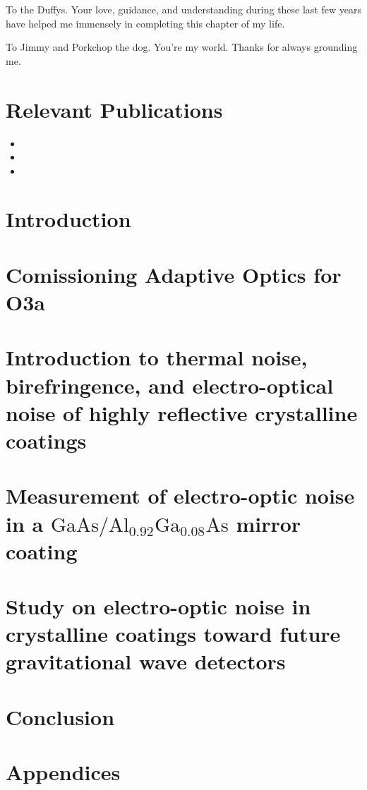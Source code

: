 \documentclass[12pt]{report}
\newif\ifswitch
\newcommand{\algaas}{\mathrm{Al_{0.92}Ga_{0.08}As}}
\newcommand{\gaas}{\mathrm{GaAs}}
\begin{document}
To the Duffys. Your love, guidance, and understanding during these last few years have helped me immensely in completing this chapter of my life.

To Jimmy and Porkchop the dog. You’re my world. Thanks for always grounding me.

\ifswitch
    \nobibliography*
    \chapter*{Relevant Publications}
    \begin{itemize}
        \item {}
        \item {}
        \item {}
    \end{itemize}


\tableofcontents


\chapter{Introduction}

\newpage

\chapter{Comissioning Adaptive Optics for O3a}

\newpage

\chapter{Introduction to thermal noise, birefringence, and electro-optical noise of highly reflective crystalline coatings}

\newpage 

\chapter{Measurement of electro-optic noise in a \texorpdfstring{$\gaas / \algaas$}{gaas/algaas} mirror coating}

\newpage

\chapter{Study on electro-optic noise in crystalline coatings toward future gravitational wave detectors}

\newpage 

\chapter{Conclusion}

\newpage

\chapter*{Appendices} 




\end{document}
